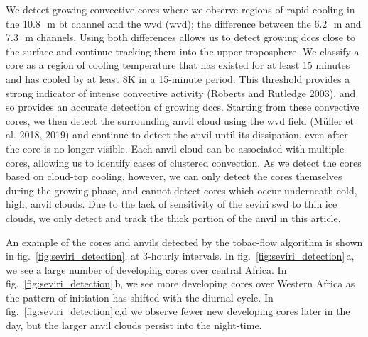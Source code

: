 We detect growing convective cores where we observe regions of rapid
cooling in the 10.8\,\unit{\mu m} \acrshort{bt} channel and the \acrshort{wvd} (\acrshort{wvd});
the difference between the 6.2\,\unit{\mu m} and 7.3\,\unit{\mu m} channels. Using both
differences allows us to detect growing \acrshort{dcc}s close to the surface and
continue tracking them into the upper troposphere. We classify a core as
a region of cooling temperature that has existed for at least 15 minutes
and has cooled by at least 8K in a 15-minute period. This threshold
provides a strong indicator of intense convective activity (Roberts and
Rutledge 2003), and so provides an accurate detection of growing \acrshort{dcc}s.
Starting from these convective cores, we then detect the surrounding
anvil cloud using the \acrshort{wvd} field (Müller et al. 2018, 2019) and continue
to detect the anvil until its dissipation, even after the core is no
longer visible. Each anvil cloud can be associated with multiple cores,
allowing us to identify cases of clustered convection. As we detect the
cores based on cloud-top cooling, however, we can only detect the cores
themselves during the growing phase, and cannot detect cores which occur
underneath cold, high, anvil clouds. Due to the lack of sensitivity of
the \acrshort{seviri} \acrshort{swd} to thin ice clouds, we only detect and track the thick
portion of the anvil in this article.

An example of the cores and anvils detected by the tobac-flow algorithm
is shown in fig.~\ref{fig:seviri_detection}, at 3-hourly intervals. In fig.~\ref{fig:seviri_detection}\,a, we see a large
number of developing cores over central Africa. In fig.~\ref{fig:seviri_detection}\,b, we see more
developing cores over Western Africa as the pattern of initiation has
shifted with the diurnal cycle. In fig.~\ref{fig:seviri_detection}\,c,d we observe fewer new
developing cores later in the day, but the larger anvil clouds persist
into the night-time.


